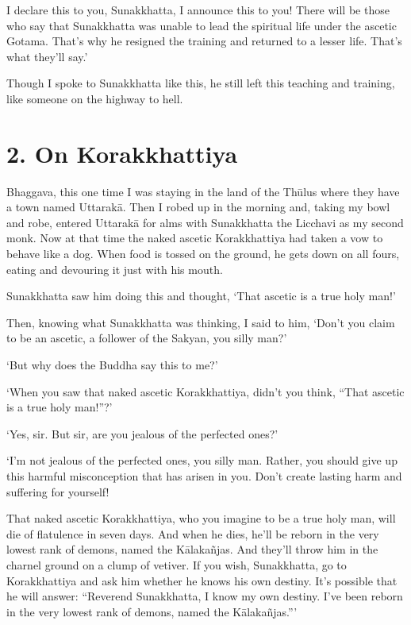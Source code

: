 \documentclass[12pt,openany]{book}%
\begin{document}
I declare this to you, Sunakkhatta, I announce this to you! There will be those who say that Sunakkhatta was unable to lead the spiritual life under the ascetic Gotama. That’s why he resigned the training and returned to a lesser life. That’s what they’ll say.’ 

Though I spoke to Sunakkhatta like this, he still left this teaching and training, like someone on the highway to hell. 

\section*{2. On Korakkhattiya }

Bhaggava, this one time I was staying in the land of the \textsanskrit{Thūlus} where they have a town named \textsanskrit{Uttarakā}. Then I robed up in the morning and, taking my bowl and robe, entered \textsanskrit{Uttarakā} for alms with Sunakkhatta the Licchavi as my second monk. Now at that time the naked ascetic Korakkhattiya had taken a vow to behave like a dog. When food is tossed on the ground, he gets down on all fours, eating and devouring it just with his mouth. 

Sunakkhatta saw him doing this and thought, ‘That ascetic is a true holy man!’ 

Then, knowing what Sunakkhatta was thinking, I said to him, ‘Don’t you claim to be an ascetic, a follower of the Sakyan, you silly man?’ 

‘But why does the Buddha say this to me?’ 

‘When you saw that naked ascetic Korakkhattiya, didn’t you think, “That ascetic is a true holy man!”?’ 

‘Yes, sir. But sir, are you jealous of the perfected ones?’ 

‘I’m not jealous of the perfected ones, you silly man. Rather, you should give up this harmful misconception that has arisen in you. Don’t create lasting harm and suffering for yourself! 

That naked ascetic Korakkhattiya, who you imagine to be a true holy man, will die of flatulence in seven days. And when he dies, he’ll be reborn in the very lowest rank of demons, named the \textsanskrit{Kālakañjas}. And they’ll throw him in the charnel ground on a clump of vetiver. If you wish, Sunakkhatta, go to Korakkhattiya and ask him whether he knows his own destiny. It’s possible that he will answer: “Reverend Sunakkhatta, I know my own destiny. I’ve been reborn in the very lowest rank of demons, named the \textsanskrit{Kālakañjas}.”’ 
\end{document}
